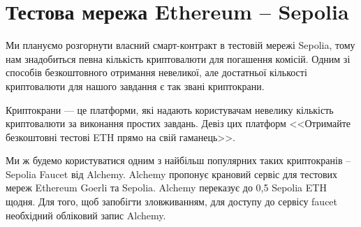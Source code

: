 \section{Тестова мережа Ethereum -- Sepolia}

Ми плануємо розгорнути власний смарт-контракт в тестовій мережі Sepolia, тому нам знадобиться певна кількість криптовалюти для погашення комісій. Одним зі способів безкоштовного отримання невеликої, але достатньої кількості криптовалюти для нашого завдання є так звані криптокрани.

Криптокрани --- це платформи, які надають користувачам невелику кількість криптовалюти за виконання простих завдань. Девіз цих платформ <<Отримайте безкоштовні тестові ETH прямо на свій гаманець>>.

Ми ж будемо користуватися одним з найбільш популярних таких криптокранів -- Sepolia Faucet від Alchemy. Alchemy пропонує крановий сервіс для тестових мереж Ethereum Goerli та Sepolia. Alchemy переказує до 0,5 Sepolia ETH щодня. Для того, щоб запобігти зловживанням, для доступу до сервісу faucet необхідний обліковий запис Alchemy.

